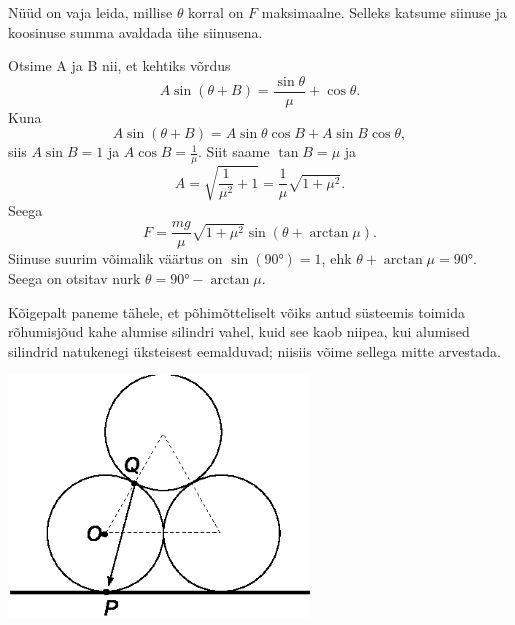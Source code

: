 \documentclass[10pt, twoside]{article}
\begin{document}
{Nüüd on vaja leida, millise $\theta$ korral on $F$ maksimaalne. Selleks katsume siinuse ja koosinuse summa avaldada ühe siinusena. 

Otsime A ja B nii, et kehtiks võrdus 
\[
A\sin (\theta+B)=\frac{\sin\theta}{\mu}+\cos\theta.
\]
Kuna 
\[
A\sin (\theta+B)=A\sin\theta\cos B + A\sin B \cos\theta,
\]
siis 
$A\sin B=1$ ja $A\cos B=\frac{1}{\mu}$. Siit saame $\tan B=\mu$ ja 
\[
A=\sqrt{\frac{1}{{\mu}^2} + 1}=\frac{1}{\mu}\sqrt{1+{\mu}^2}.
\]
Seega 
\[
F=\frac{mg}{\mu}\sqrt{1+{\mu}^2}\sin(\theta + \arctan\mu).
\]
Siinuse suurim võimalik väärtus on $\sin(\ang{90})=1$, ehk $\theta + \arctan\mu=\ang{90}$. Seega on otsitav nurk $\theta = \ang{90}-\arctan\mu$.
\probend
\bigskip


\solu
Kõigepalt paneme tähele, et põhimõtteliselt võiks antud süsteemis toimida rõhumisjõud kahe alumise silindri vahel, kuid see
kaob niipea, kui alumised silindrid natukenegi üksteisest eemalduvad; niisiis võime sellega mitte arvestada.

\begin{center}
	\includegraphics[width=0.6\textwidth]{2010-v2g-10-torudlah.eps}
\end{center}

}
\end{document}
